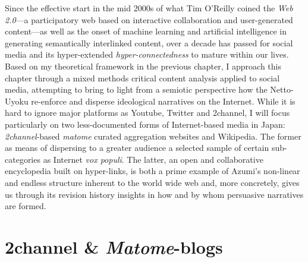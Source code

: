 \documentclass[10pt,british,A4paper,,openany]{memoir}
\begin{document}
Since the effective start in the mid 2000s of what Tim O'Reilly coined
the \emph{Web 2.0}---a participatory web based on interactive
collaboration and user-generated content---as well as the onset of
machine learning and artificial intelligence in generating semantically
interlinked content, over a decade has passed for social media and its
hyper-extended \emph{hyper-connectedness} to mature within our lives.
Based on my theoretical framework in the previous chapter, I approach
this chapter through a mixed methods critical content analysis applied
to social media, attempting to bring to light from a semiotic
perspective how the Netto-Uyoku re-enforce and disperse ideological
narratives on the Internet. While it is hard to ignore major platforms
as Youtube, Twitter and 2channel, I will focus particularly on two
less-documented forms of Internet-based media in Japan:
\emph{2channel}-based \emph{matome} curated aggregation websites and
Wikipedia. The former as means of dispersing to a greater audience a
selected sample of certain sub-categories as Internet \emph{vox populi}.
The latter, an open and collaborative encyclopedia built on hyper-links,
is both a prime example of Azumi's non-linear and endless structure
inherent to the world wide web and, more concretely, gives us through
its revision history insights in how and by whom persuasive narratives
are formed.

\section{\texorpdfstring{2channel \&
\emph{Matome}-blogs}{2channel \& Matome-blogs}}\label{channel-matome-blogs}
\end{document}
